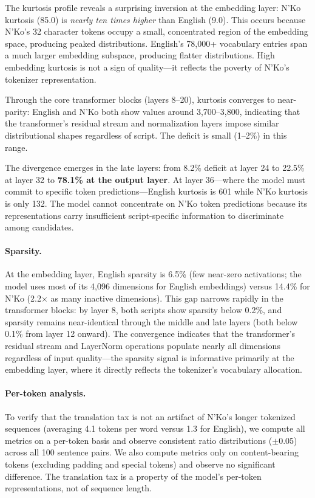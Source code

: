 \documentclass[11pt]{article}
\begin{document}
The kurtosis profile reveals a surprising inversion at the embedding layer: N'Ko kurtosis (85.0) is \emph{nearly ten times higher} than English (9.0).
This occurs because N'Ko's 32 character tokens occupy a small, concentrated region of the embedding space, producing peaked distributions.
English's 78,000+ vocabulary entries span a much larger embedding subspace, producing flatter distributions.
High embedding kurtosis is not a sign of quality---it reflects the poverty of N'Ko's tokenizer representation.

Through the core transformer blocks (layers 8--20), kurtosis converges to near-parity: English and N'Ko both show values around 3,700--3,800, indicating that the transformer's residual stream and normalization layers impose similar distributional shapes regardless of script.
The deficit is small (1--2\%) in this range.

The divergence emerges in the late layers: from 8.2\% deficit at layer 24 to 22.5\% at layer 32 to \textbf{78.1\% at the output layer}.
At layer 36---where the model must commit to specific token predictions---English kurtosis is 601 while N'Ko kurtosis is only 132.
The model cannot concentrate on N'Ko token predictions because its representations carry insufficient script-specific information to discriminate among candidates.

\paragraph{Sparsity.}
At the embedding layer, English sparsity is 6.5\% (few near-zero activations; the model uses most of its 4,096 dimensions for English embeddings) versus 14.4\% for N'Ko (2.2$\times$ as many inactive dimensions).
This gap narrows rapidly in the transformer blocks: by layer 8, both scripts show sparsity below 0.2\%, and sparsity remains near-identical through the middle and late layers (both below 0.1\% from layer 12 onward).
The convergence indicates that the transformer's residual stream and LayerNorm operations populate nearly all dimensions regardless of input quality---the sparsity signal is informative primarily at the embedding layer, where it directly reflects the tokenizer's vocabulary allocation.

\paragraph{Per-token analysis.}
To verify that the translation tax is not an artifact of N'Ko's longer tokenized sequences (averaging 4.1 tokens per word versus 1.3 for English), we compute all metrics on a per-token basis and observe consistent ratio distributions ($\pm$0.05) across all 100 sentence pairs.
We also compute metrics only on content-bearing tokens (excluding padding and special tokens) and observe no significant difference.
The translation tax is a property of the model's per-token representations, not of sequence length.
\end{document}
